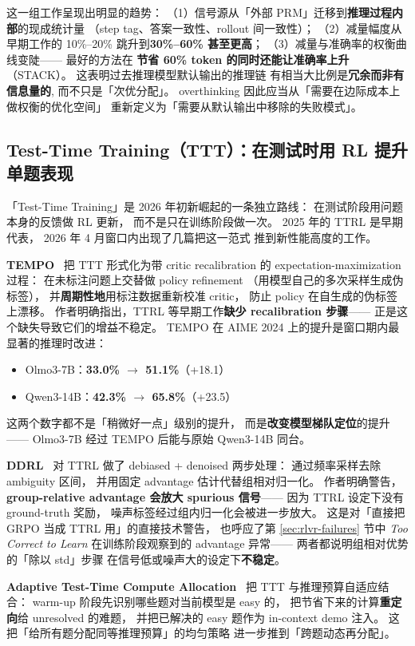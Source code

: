 这一组工作呈现出明显的趋势：
（1）信号源从「外部 PRM」迁移到\textbf{推理过程内部}的现成统计量
（step tag、答案一致性、rollout 间一致性）；
（2）减量幅度从早期工作的 10\%--20\%
跳升到\textbf{30\%--60\% 甚至更高}；
（3）减量与准确率的权衡曲线变陡——
最好的方法在 \textbf{节省 60\% token 的同时还能让准确率上升}（STACK）。
这表明过去推理模型默认输出的推理链
有相当大比例是\textbf{冗余而非有信息量的},
而不只是「次优分配」。
overthinking 因此应当从「需要在边际成本上做权衡的优化空间」
重新定义为「需要从默认输出中移除的失败模式」。

\subsection{Test-Time Training（TTT）：在测试时用 RL 提升单题表现}
\label{sec:ttt}

「Test-Time Training」是 2026 年初新崛起的一条独立路线：
在测试阶段用问题本身的反馈做 RL 更新，
而不是只在训练阶段做一次。
2025 年的 TTRL 是早期代表，
2026 年 4 月窗口内出现了几篇把这一范式
推到新性能高度的工作。

\textbf{TEMPO}~\cite{tempo2026}
把 TTT 形式化为带 critic recalibration 的
expectation-maximization 过程：
在未标注问题上交替做 policy refinement
（用模型自己的多次采样生成伪标签），
并\textbf{周期性地}用标注数据重新校准 critic，
防止 policy 在自生成的伪标签上漂移。
作者明确指出，TTRL 等早期工作\textbf{缺少 recalibration 步骤}——
正是这个缺失导致它们的增益不稳定。
TEMPO 在 AIME 2024 上的提升是窗口期内最显著的推理时改进：
\begin{itemize}[noitemsep]
  \item Olmo3-7B：\textbf{33.0\% $\to$ 51.1\%}（+18.1）
  \item Qwen3-14B：\textbf{42.3\% $\to$ 65.8\%}（+23.5）
\end{itemize}
这两个数字都不是「稍微好一点」级别的提升，
而是\textbf{改变模型梯队定位}的提升——
Olmo3-7B 经过 TEMPO 后能与原始 Qwen3-14B 同台。

\textbf{DDRL}~\cite{ddrl2026}
对 TTRL 做了 debiased + denoised 两步处理：
通过频率采样去除 ambiguity 区间，
并用固定 advantage 估计代替组相对归一化。
作者明确警告，
\textbf{group-relative advantage 会放大 spurious 信号}——
因为 TTRL 设定下没有 ground-truth 奖励，
噪声标签经过组内归一化会被进一步放大。
这是对「直接把 GRPO 当成 TTRL 用」的直接技术警告，
也呼应了第 \ref{sec:rlvr-failures} 节中
\textit{Too Correct to Learn} 在训练阶段观察到的 advantage 异常——
两者都说明组相对优势的「除以 std」步骤
在信号低或噪声大的设定下\textbf{不稳定}。

\textbf{Adaptive Test-Time Compute Allocation}~\cite{adaptivettc2026}
把 TTT 与推理预算自适应结合：
warm-up 阶段先识别哪些题对当前模型是 easy 的，
把节省下来的计算\textbf{重定向}给 unresolved 的难题，
并把已解决的 easy 题作为 in-context demo 注入。
这把「给所有题分配同等推理预算」的均匀策略
进一步推到「跨题动态再分配」。


